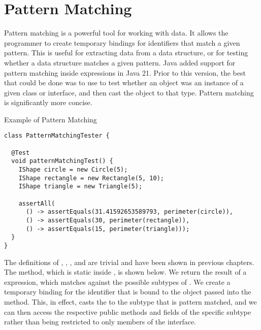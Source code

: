 \section{Pattern Matching}

Pattern matching is a powerful tool for working with data. It allows the programmer to create temporary bindings for identifiers that match a given pattern. This is useful for extracting data from a data structure, or for testing whether a data structure matches a given pattern. Java added support for pattern matching inside  expressions in Java 21. Prior to this version, the best that could be done was to use  to test whether an object was an instance of a given class or interface, and then cast the object to that type. Pattern matching is significantly more concise.


\begin{cl}{Example of Pattern Matching}
\begin{lstlisting}[language=MyJava]
class PatternMatchingTester {

  @Test
  void patternMatchingTest() {
    IShape circle = new Circle(5);
    IShape rectangle = new Rectangle(5, 10);
    IShape triangle = new Triangle(5);

    assertAll(
      () -> assertEquals(31.41592653589793, perimeter(circle)),
      () -> assertEquals(30, perimeter(rectangle)),
      () -> assertEquals(15, perimeter(triangle)));
  }
}
\end{lstlisting}
\end{cl}

The definitions of , , , and  are trivial and have been shown in previous chapters. The  method, which is static inside , is shown below. We return the result of a  expression, which matches against the possible subtypes of . We create a temporary binding for the identifier  that is bound to the  object passed into the method. This, in effect, casts the  to the subtype that is pattern matched, and we can then access the respective public methods and fields of the specific subtype rather than being restricted to only members of the  interface.

